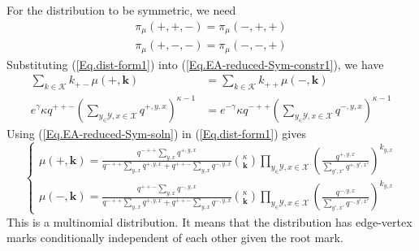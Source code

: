 \documentclass[12pt]{article}
\numberwithin{equation}{section}
\begin{document}
For the distribution to be symmetric, we need
\begin{align}
    \pi_\mu(+, +, -) = \pi_\mu(-, +, +) \label{Eq.EA-reduced-Sym-constr1} \\
    \pi_\mu(+, -, -) = \pi_\mu(-, -, +) \label{Eq.EA-reduced-Sym-constr2}
\end{align}
Substituting (\ref{Eq.dist-form1}) into (\ref{Eq.EA-reduced-Sym-constr1}), we have
\begin{align}
    \sum_{k\in\mathcal{K}}k_{+-}\mu(+, \mathbf{k})                                                       & = \sum_{k\in\mathcal{K}}k_{++}\mu(-, \mathbf{k})                                                         \nonumber                       \\
    e^\gamma\kappa q^{++-} \left(\sum_{{y_\in\mathcal{Y}, x\in\mathcal{X}}}q^{+, y, x}\right)^{\kappa-1} & = e^{-\gamma}\kappa q^{-++} \left(\sum_{{y_\in\mathcal{Y}, x\in\mathcal{X}}}q^{-, y, x}\right)^{\kappa-1} \label{Eq.EA-reduced-Sym-soln}
\end{align}
Using (\ref{Eq.EA-reduced-Sym-soln}) in (\ref{Eq.dist-form1}) gives
\begin{equation}
    \begin{cases}
        \mu(+, \mathbf{k}) = \displaystyle{\frac{q^{-++}\sum_{y, x}q^{+,y,x}}{q^{-++}\sum_{y, x}q^{+,y,x} + q^{++-}\sum_{y, x}q^{-,y,x}}{\kappa\choose\mathbf{k}} \prod_{y_\in\mathcal{Y}, x\in\mathcal{X}}\left(\frac{q^{+,y,x}}{\sum_{y', x'}q^{+,y',x'}}\right)^{k_{y,x}}} \\
        \mu(-, \mathbf{k}) = \displaystyle{\frac{q^{++-}\sum_{y, x}q^{-,y,x}}{q^{-++}\sum_{y, x}q^{+,y,x} + q^{++-}\sum_{y, x}q^{-,y,x}}{\kappa\choose\mathbf{k}} \prod_{y_\in\mathcal{Y}, x\in\mathcal{X}}\left(\frac{q^{-,y,x}}{\sum_{y', x'}q^{-,y',x'}}\right)^{k_{y,x}}}
    \end{cases}
    \label{Eq.dist-form2}
\end{equation}
This is a multinomial distribution. It means that the distribution has edge-vertex marks conditionally independent of each other given the root mark.
\end{document}
